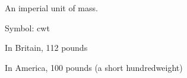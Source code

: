 An imperial unit of mass.
\par
Symbol: cwt 
\par
In Britain, 112 pounds
\par
In America, 100 pounds (a short hundredweight)